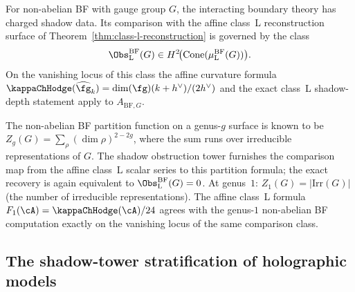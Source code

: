 \begin{remark}
For non-abelian BF with gauge group $G$, the interacting boundary theory has
charged shadow data. Its comparison with the affine class~L reconstruction
surface of Theorem~\ref{thm:class-l-reconstruction} is governed by the class
\[
\Obs^{\mathrm{BF}}_{\mathrm{L}}(G)\in
H^2\!\bigl(\Cone(\mu^{\mathrm{BF}}_{\mathrm{L}}(G))\bigr).
\]
On the vanishing locus of this class the affine curvature formula
$\kappaChHodge(\widehat{\fg}_k)=\dim(\fg)(k+h^\vee)/(2h^\vee)$ and the exact
class~L shadow-depth statement apply to $A_{\mathrm{BF},G}$.

The non-abelian BF partition function on a genus-$g$ surface is known to be
$Z_g(G) = \sum_{\rho} (\dim\rho)^{2-2g}$, where the sum runs over irreducible
representations of $G$. The shadow obstruction tower furnishes the comparison
map from the affine class~L scalar series to this partition formula; the exact
recovery is again equivalent to $\Obs^{\mathrm{BF}}_{\mathrm{L}}(G)=0$.
At genus~$1$: $Z_1(G) = |\mathrm{Irr}(G)|$ (the number of irreducible representations).
The affine class~L formula
$F_1(\cA)=\kappaChHodge(\cA)/24$ agrees with the genus-$1$
non-abelian BF computation exactly on the vanishing locus of the same
comparison class.
\end{remark}

\subsection{The shadow-tower stratification of holographic models}

